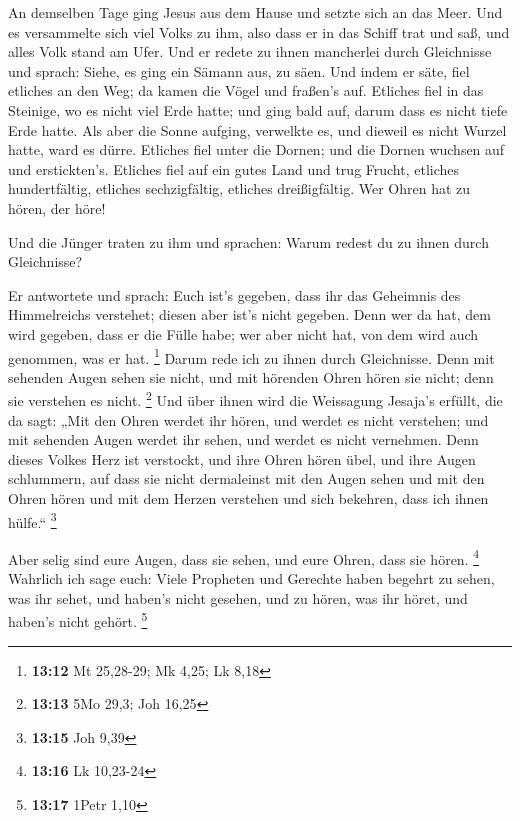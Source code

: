  An demselben Tage ging Jesus aus dem Hause und setzte
sich an das Meer.  Und es versammelte sich viel Volks zu
ihm, also dass er in das Schiff trat und saß, und alles Volk stand am
Ufer.  Und er redete zu ihnen mancherlei durch Gleichnisse
und sprach: Siehe, es ging ein Sämann aus, zu säen.  Und
indem er säte, fiel etliches an den Weg; da kamen die Vögel und fraßen's
auf.  Etliches fiel in das Steinige, wo es nicht viel Erde
hatte; und ging bald auf, darum dass es nicht tiefe Erde hatte.
 Als aber die Sonne aufging, verwelkte es, und dieweil es
nicht Wurzel hatte, ward es dürre.  Etliches fiel unter
die Dornen; und die Dornen wuchsen auf und erstickten's. 
Etliches fiel auf ein gutes Land und trug Frucht, etliches
hundertfältig, etliches sechzigfältig, etliches dreißigfältig.
 Wer Ohren hat zu hören, der höre!

 Und die Jünger traten zu ihm und sprachen: Warum redest
du zu ihnen durch Gleichnisse?

 Er antwortete und sprach: Euch ist's gegeben, dass ihr
das Geheimnis des Himmelreichs verstehet; diesen aber ist's nicht
gegeben.  Denn wer da hat, dem wird gegeben, dass er die
Fülle habe; wer aber nicht hat, von dem wird auch genommen, was er hat.
\footnote{\textbf{13:12} Mt 25,28-29; Mk 4,25; Lk 8,18} 
Darum rede ich zu ihnen durch Gleichnisse. Denn mit sehenden Augen sehen
sie nicht, und mit hörenden Ohren hören sie nicht; denn sie verstehen es
nicht. \footnote{\textbf{13:13} 5Mo 29,3; Joh 16,25}  Und
über ihnen wird die Weissagung Jesaja's erfüllt, die da sagt: „Mit den
Ohren werdet ihr hören, und werdet es nicht verstehen; und mit sehenden
Augen werdet ihr sehen, und werdet es nicht vernehmen. 
Denn dieses Volkes Herz ist verstockt, und ihre Ohren hören übel, und
ihre Augen schlummern, auf dass sie nicht dermaleinst mit den Augen
sehen und mit den Ohren hören und mit dem Herzen verstehen und sich
bekehren, dass ich ihnen hülfe.`` \footnote{\textbf{13:15} Joh 9,39}

 Aber selig sind eure Augen, dass sie sehen, und eure
Ohren, dass sie hören. \footnote{\textbf{13:16} Lk 10,23-24}
 Wahrlich ich sage euch: Viele Propheten und Gerechte
haben begehrt zu sehen, was ihr sehet, und haben's nicht gesehen, und zu
hören, was ihr höret, und haben's nicht gehört. \footnote{\textbf{13:17}
  1Petr 1,10}

